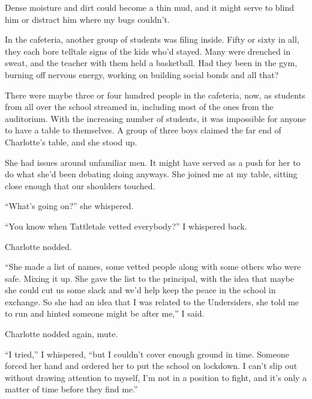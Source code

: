 Dense moisture and dirt could become a thin mud, and it might serve to blind him or distract him where my bugs couldn't.



In the cafeteria, another group of students was filing inside.  Fifty or sixty in all, they each bore telltale signs of the kids who'd stayed.  Many were drenched in sweat, and the teacher with them held a basketball.  Had they been in the gym, burning off nervous energy, working on building social bonds and all that?



There were maybe three or four hundred people in the cafeteria, now, as students from all over the school streamed in, including most of the ones from the auditorium.  With the increasing number of students, it was impossible for anyone to have a table to themselves.  A group of three boys claimed the far end of Charlotte's table, and she stood up.



She had issues around unfamiliar men.  It might have served as a push for her to do what she'd been debating doing anyways.  She joined me at my table, sitting close enough that our shoulders touched.



``What's going on?'' she whispered.



``You know when Tattletale vetted everybody?''  I whispered back.



Charlotte nodded.



``She made a list of names, some vetted people along with some others who were safe.  Mixing it up.  She gave the list to the principal, with the idea that maybe she could cut us some slack and we'd help keep the peace in the school in exchange.  So she had an idea that I was related to the Undersiders, she told me to run and hinted someone might be after me,'' I said.



Charlotte nodded again, mute.



``I tried,'' I whispered, ``but I couldn't cover enough ground in time.  Someone forced her hand and ordered her to put the school on lockdown.  I can't slip out without drawing attention to myself, I'm not in a position to fight, and it's only a matter of time before they find me.''



